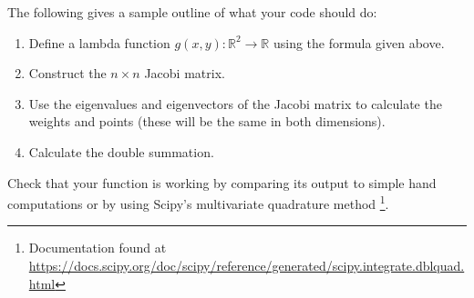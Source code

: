 The following gives a sample outline of what your code should do:
\begin{enumerate}
\item Define a lambda function $g(x,y):\mathbb{R}^2 \rightarrow \mathbb{R}$ using the formula given above.
\item Construct the $n\times n$ Jacobi matrix.
\item Use the eigenvalues and eigenvectors of the Jacobi matrix to calculate the weights and points (these will be the same in both dimensions).
\item Calculate the double summation.
\end{enumerate}

Check that your function is working by comparing its output to simple hand computations or by using Scipy's multivariate quadrature method 
\footnote{Documentation found at \url{https://docs.scipy.org/doc/scipy/reference/generated/scipy.integrate.dblquad.html}}.
